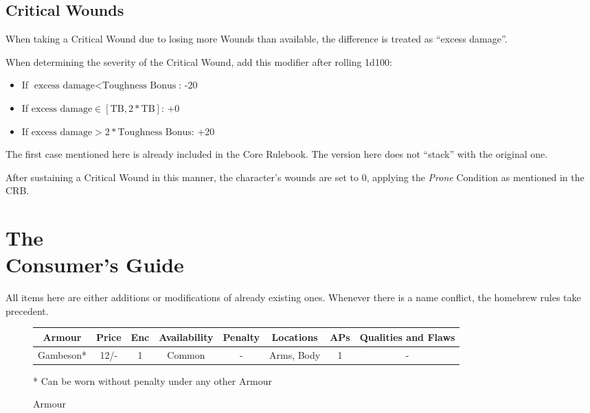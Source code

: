 \documentclass[parskip=full,11pt]{wfrp-short}
\begin{document}
\subsection{Critical Wounds}
When taking a Critical Wound due to losing more Wounds than available, the
difference is treated as \enquote{excess damage}.

When determining the severity of the Critical Wound, add this modifier after
rolling 1d100:
\begin{itemize}
    \item If $\text{excess damage} < \text{Toughness Bonus}$: -20
    \item If $\text{excess damage} \in [\text{TB}, 2*\text{TB}]$: +0
    \item If $\text{excess damage} > 2* \text{Toughness Bonus}$: +20
\end{itemize}

The first case mentioned here is already included in the Core Rulebook.
The version here does not \enquote{stack} with the original one.

After sustaining a Critical Wound in this manner, the character's wounds are
set to 0, applying the \textit{Prone} Condition as mentioned in the CRB.

\section{The\\Consumer's Guide}

All items here are either additions or modifications of already existing ones.
Whenever there is a name conflict, the homebrew rules take precedent.

\begin{figure*}[b]
    \begin{tcolorbox}[standard jigsaw, colback=yellow!5!orange, opacityback=.25, boxrule=0pt]
    \caption{Armour}
    \centering
    \begin{tabu}{c|c|c|c|c|c|c|c}
        \rowfont{\bfseries} Armour & Price & Enc & Availability &
            Penalty & Locations & APs & Qualities and Flaws\\
        \hline
        Gambeson* & 12/- & 1 & Common & - & Arms, Body & 1 & -\\
    \end{tabu}
		\newline \newline
		* Can be worn without penalty under any other Armour
    \end{tcolorbox}
\end{figure*}
\end{document}

